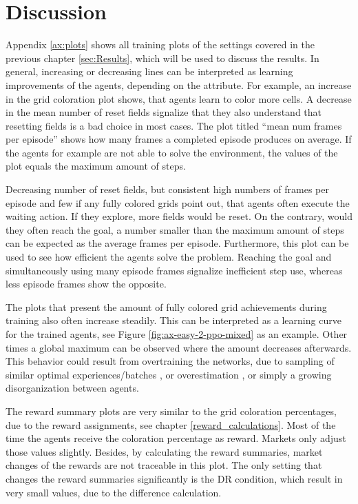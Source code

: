 \chapter{Discussion}\label{sec:Discussion}
Appendix \ref{ax:plots} shows all training plots of the settings covered in the previous chapter \ref{sec:Results}, which will be used to discuss the results. In general, increasing or decreasing lines can be interpreted as learning improvements of the agents, depending on the attribute. For example, an increase in the grid coloration plot shows, that agents learn to color more cells. A decrease in the mean number of reset fields signalize that they also understand that resetting fields is a bad choice in most cases. The plot titled ``mean num frames per episode'' shows how many frames a completed episode produces on average. If the agents for example are not able to solve the environment, the values of the plot equals the maximum amount of steps. 

Decreasing number of reset fields, but consistent high numbers of frames per episode and few if any fully colored grids point out, that agents often execute the waiting action. If they explore, more fields would be reset. On the contrary, would they often reach the goal, a number smaller than the maximum amount of steps can be expected as the average frames per episode. Furthermore, this plot can be used to see how efficient the agents solve the problem. Reaching the goal and simultaneously using many episode frames signalize inefficient step use, whereas less episode frames show the opposite.

The plots that present the amount of fully colored grid achievements during training also often increase steadily. This can be interpreted as a learning curve for the trained agents, see Figure \ref{fig:ax-easy-2-ppo-mixed} as an example. Other times a global maximum can be observed where the amount decreases afterwards. This behavior could result from overtraining the networks, due to sampling of similar optimal experiences/batches \cite{zhvi18}, or overestimation \cite{hemo18}, or simply a growing disorganization between agents.

The reward summary plots are very similar to the grid coloration percentages, due to the reward assignments, see chapter \ref{reward_calculations}. Most of the time the agents receive the coloration percentage as reward. Markets only adjust those values slightly. Besides, by calculating the reward summaries, market changes of the rewards are not traceable in this plot. The only setting that changes the reward summaries significantly is the DR condition, which result in very small values, due to the difference calculation.

